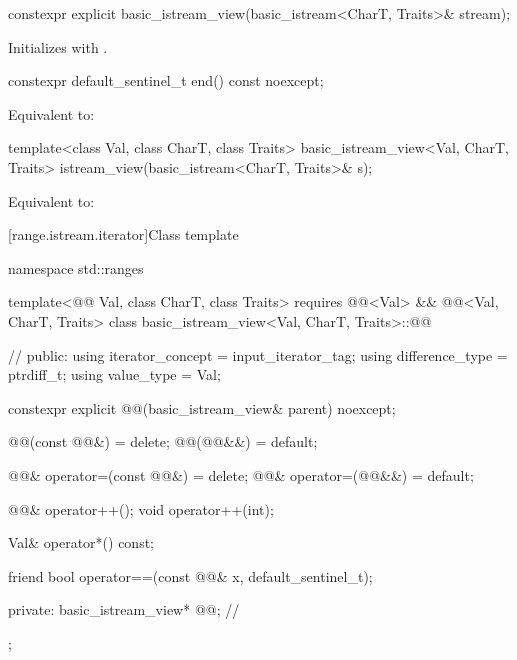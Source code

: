 %
\begin{itemdecl}
constexpr explicit basic_istream_view(basic_istream<CharT, Traits>& stream);
\end{itemdecl}

\begin{itemdescr}
\pnum
\effects
Initializes  with .
\end{itemdescr}

%
\begin{itemdecl}
constexpr default_sentinel_t end() const noexcept;
\end{itemdecl}

\begin{itemdescr}
\pnum
\effects
Equivalent to: 
\end{itemdescr}

%
\begin{itemdecl}
template<class Val, class CharT, class Traits>
basic_istream_view<Val, CharT, Traits> istream_view(basic_istream<CharT, Traits>& s);
\end{itemdecl}

\begin{itemdescr}
\pnum
\effects
Equivalent to: 
\end{itemdescr}

[range.istream.iterator]{Class template }

%
\begin{codeblock}
namespace std::ranges {
  template<@@ Val, class CharT, class Traits>
    requires @@<Val> &&
             @@<Val, CharT, Traits>
  class basic_istream_view<Val, CharT, Traits>::@@ {      // \expos
  public:
    using iterator_concept = input_iterator_tag;
    using difference_type = ptrdiff_t;
    using value_type = Val;

    constexpr explicit @@(basic_istream_view& parent) noexcept;

    @@(const @@&) = delete;
    @@(@@&&) = default;

    @@& operator=(const @@&) = delete;
    @@& operator=(@@&&) = default;

    @@& operator++();
    void operator++(int);

    Val& operator*() const;

    friend bool operator==(const @@& x, default_sentinel_t);

  private:
    basic_istream_view* @@;                                // \expos
  };
}
\end{codeblock}

